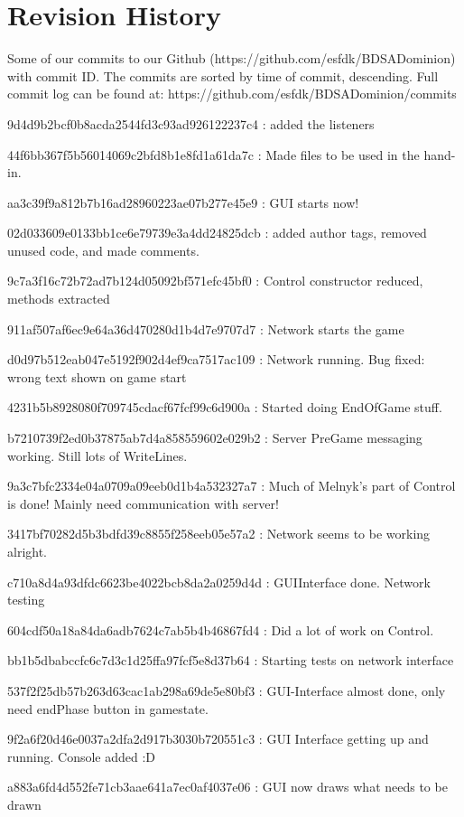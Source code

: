 \section{Revision History}
Some of our commits to our Github (https://github.com/esfdk/BDSADominion)  with commit ID. The commits are sorted by time of commit, descending. Full commit log can be found at: https://github.com/esfdk/BDSADominion/commits

9d4d9b2bcf0b8acda2544fd3c93ad926122237c4 : added the listeners

44f6bb367f5b56014069c2bfd8b1e8fd1a61da7c : Made files to be used in the hand-in.

aa3c39f9a812b7b16ad28960223ae07b277e45e9 : GUI starts now!

02d033609e0133bb1ce6e79739e3a4dd24825dcb : added author tags, removed unused code, and made comments.

9c7a3f16c72b72ad7b124d05092bf571efc45bf0 : Control constructor reduced, methods extracted

911af507af6ec9e64a36d470280d1b4d7e9707d7 : Network starts the game

d0d97b512eab047e5192f902d4ef9ca7517ac109 : Network running. Bug fixed: wrong text shown on game start

4231b5b8928080f709745cdacf67fcf99c6d900a : Started doing EndOfGame stuff.

b7210739f2ed0b37875ab7d4a858559602e029b2 : Server PreGame messaging working. Still lots of WriteLines.

9a3c7bfc2334e04a0709a09eeb0d1b4a532327a7 : Much of Melnyk's part of Control is done! Mainly need communication with server!

3417bf70282d5b3bdfd39c8855f258eeb05e57a2 : Network seems to be working alright.

c710a8d4a93dfdc6623be4022bcb8da2a0259d4d : GUIInterface done. Network testing

604cdf50a18a84da6adb7624c7ab5b4b46867fd4 : Did a lot of work on Control.

bb1b5dbabccfc6c7d3c1d25ffa97fcf5e8d37b64 : Starting tests on network interface

537f2f25db57b263d63cac1ab298a69de5e80bf3 : GUI-Interface almost done, only need endPhase button in gamestate.

9f2a6f20d46e0037a2dfa2d917b3030b720551c3 : GUI Interface getting up and running. Console added :D

a883a6fd4d552fe71cb3aae641a7ec0af4037e06 : GUI now draws what needs to be drawn

